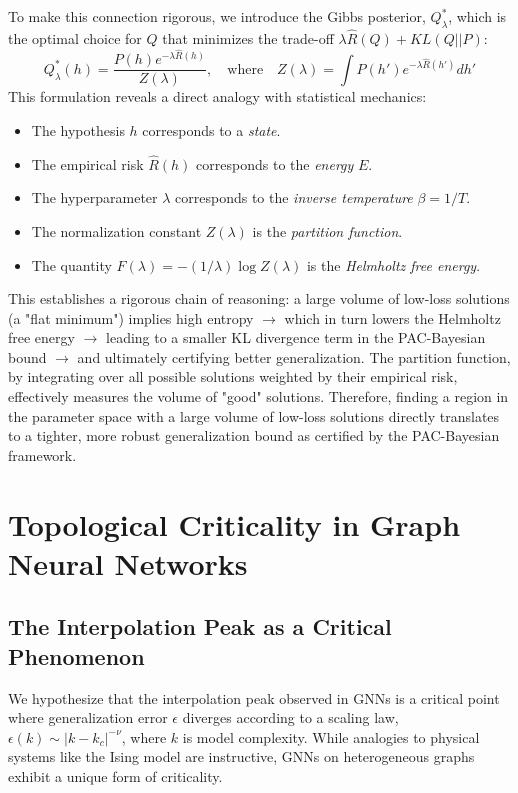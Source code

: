 \documentclass[10pt,oneside,oldfontcommands,dvipsnames,article]{memoir}
\begin{document}
To make this connection rigorous, we introduce the Gibbs posterior, $Q^*_{\lambda}$, which is the optimal choice for $Q$ that minimizes the trade-off $\lambda \hat{R}(Q) + KL(Q || P)$:
\begin{equation}
    Q^*_{\lambda}(h) = \frac{P(h) e^{-\lambda \hat{R}(h)}}{Z(\lambda)}, \quad \text{where} \quad Z(\lambda) = \int P(h') e^{-\lambda \hat{R}(h')} dh'
\end{equation}
This formulation reveals a direct analogy with statistical mechanics:
\begin{itemize}[itemsep=1pt,topsep=0.5pt]
    \item The hypothesis $h$ corresponds to a \textit{state}.
    \item The empirical risk $\hat{R}(h)$ corresponds to the \textit{energy} $E$.
    \item The hyperparameter $\lambda$ corresponds to the \textit{inverse temperature} $\beta = 1/T$.
    \item The normalization constant $Z(\lambda)$ is the \textit{partition function}.
    \item The quantity $F(\lambda) = -(1/\lambda) \log Z(\lambda)$ is the \textit{Helmholtz free energy}.
\end{itemize}
This establishes a rigorous chain of reasoning: a large volume of low-loss solutions (a "flat minimum") implies high entropy $\rightarrow$ which in turn lowers the Helmholtz free energy $\rightarrow$ leading to a smaller KL divergence term in the PAC-Bayesian bound $\rightarrow$ and ultimately certifying better generalization. The partition function, by integrating over all possible solutions weighted by their empirical risk, effectively measures the volume of "good" solutions. Therefore, finding a region in the parameter space with a large volume of low-loss solutions directly translates to a tighter, more robust generalization bound as certified by the PAC-Bayesian framework.

\section{Topological Criticality in Graph Neural Networks}

\subsection{The Interpolation Peak as a Critical Phenomenon}
We hypothesize that the interpolation peak observed in GNNs is a critical point where generalization error $\epsilon$ diverges according to a scaling law, $\epsilon(k) \sim |k - k_c|^{-\nu}$, where $k$ is model complexity. While analogies to physical systems like the Ising model are instructive, GNNs on heterogeneous graphs exhibit a unique form of criticality.
\end{document}
